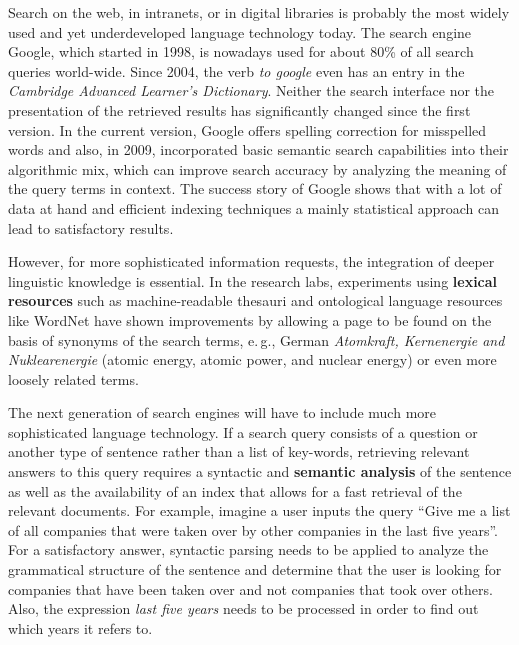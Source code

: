 \documentclass[]{../../metanetpaper}
\begin{document}
\begin{multicols}{2}
Search on the web, in intranets, or in digital libraries is probably the most widely used and yet underdeveloped language technology today. The search engine Google, which started in 1998, is nowadays used for about 80\% of all search queries world-wide\cite{spi1}. Since 2004, the verb \emph{to google} even has an entry in the \emph{Cambridge Advanced Learner’s Dictionary}. Neither the search interface nor the presentation of the retrieved results has significantly changed since the first version. In the current version, Google offers spelling correction for misspelled words and also, in 2009, incorporated basic semantic search capabilities into their algorithmic mix\cite{pc1}, which can improve search accuracy by analyzing the meaning of the query terms in context. The success story of Google shows that with a lot of data at hand and efficient indexing techniques a mainly statistical approach can lead to satisfactory results.  

However, for more sophisticated information requests, the integration of deeper linguistic knowledge is essential. In the research labs, experiments using \textbf{lexical resources} such as machine-readable thesauri and ontological language resources like WordNet have shown improvements by allowing a page to be found on the basis of synonyms of the search terms, e.\,g., German \emph{Atomkraft, Kernenergie and Nuklearenergie} (atomic energy, atomic power, and nuclear energy) or even more loosely related terms. 


The next generation of search engines will have to include much more sophisticated language technology. If a search query consists of a question or another type of sentence rather than a list of key-words, retrieving relevant answers to this query requires a syntactic and \textbf{semantic analysis} of the sentence as well as the availability of an index that allows for a fast retrieval of the relevant documents. For example, imagine a user inputs the query ``Give me a list of all companies that were taken over by other companies in the last five years''. For a satisfactory answer, syntactic parsing needs to be applied to analyze the grammatical structure of the sentence and determine that the user is looking for companies that have been taken over and not companies that took over others. Also, the expression \emph{last five years} needs to be processed in order to find out which years it refers to. 


\end{multicols}
\end{document}
